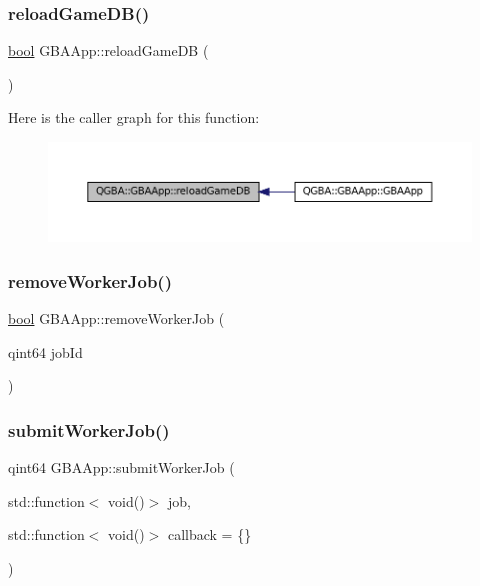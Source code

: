 \subsubsection{\texorpdfstring{reload\+Game\+D\+B()}{reloadGameDB()}}
{\footnotesize\ttfamily \mbox{\hyperlink{libretro_8h_a4a26dcae73fb7e1528214a068aca317e}{bool}} G\+B\+A\+App\+::reload\+Game\+DB (\begin{DoxyParamCaption}{ }\end{DoxyParamCaption})}

Here is the caller graph for this function\+:
\nopagebreak
\begin{figure}[H]
\begin{center}
\leavevmode
\includegraphics[width=350pt]{class_q_g_b_a_1_1_g_b_a_app_a253cf2c502553990bf498bf91433d52a_icgraph}
\end{center}
\end{figure}
\mbox{\label{class_q_g_b_a_1_1_g_b_a_app_a71e13f90bf87f7d826710353392f33b5}} 
\subsubsection{\texorpdfstring{remove\+Worker\+Job()}{removeWorkerJob()}}
{\footnotesize\ttfamily \mbox{\hyperlink{libretro_8h_a4a26dcae73fb7e1528214a068aca317e}{bool}} G\+B\+A\+App\+::remove\+Worker\+Job (\begin{DoxyParamCaption}\item[{qint64}]{job\+Id }\end{DoxyParamCaption})}

\mbox{\label{class_q_g_b_a_1_1_g_b_a_app_ad2506b0b8187a038933dc00a4fb0de88}} 
\subsubsection{\texorpdfstring{submit\+Worker\+Job()}{submitWorkerJob()}\hspace{0.1cm}{\footnotesize\ttfamily [1/2]}}
{\footnotesize\ttfamily qint64 G\+B\+A\+App\+::submit\+Worker\+Job (\begin{DoxyParamCaption}\item[{std\+::function$<$ void()$>$}]{job,  }\item[{std\+::function$<$ void()$>$}]{callback = {\ttfamily \{\}} }\end{DoxyParamCaption})}

